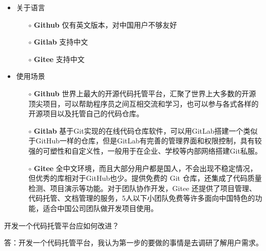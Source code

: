 \documentclass{homework}
\begin{document}
\begin{itemize}
	\item 关于语言
		\begin{itemize}
			\item[$\circ$] \textbf{Github} 仅有英文版本，对中国用户不够友好
			\item[$\circ$] \textbf{Gitlab} 支持中文
			\item[$\circ$] \textbf{Gitee} 支持中文 
		\end{itemize}
	\item 使用场景
		\begin{itemize}
			\item[$\circ$] \textbf{Github} 世界上最大的开源代码托管平台，汇聚了世界上大多数的开源顶尖项目，可以帮助程序员之间互相交流和学习，也可以参与各式各样的开源项目以及托管自己的代码仓库。
			\item[$\circ$] \textbf{Gitlab} 基于Git实现的在线代码仓库软件，可以用GitLab搭建一个类似于GitHub一样的仓库，但是GitLab有完善的管理界面和权限控制，具有较强的可塑性和自定义性，一般用于在企业、学校等内部网络搭建Git私服。
			\item[$\circ$] \textbf{Gitee} 全中文环境，而且大部分用户都是国人，不会出现不稳定情况，但优秀的库相对于GitHub也少。提供免费的 Git 仓库，还集成了代码质量检测、项目演示等功能。对于团队协作开发，Gitee 还提供了项目管理、代码托管、文档管理的服务，5人以下小团队免费等许多面向中国特色的功能，适合中国公司团队做开发项目使用。

		\end{itemize}
\end{itemize}


\question \large{开发一个代码托管平台应如何改进？}

\normalsize 答：开发一个代码托管平台，我认为第一步的要做的事情是去调研了解用户需求。
\end{document}
